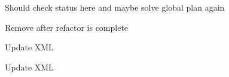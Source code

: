 
\begin{DoxyRefList}
\item[Member \mbox{\hyperlink{classtesseract__examples_1_1OnlinePlanningExample_a354985cdbaa511e24b5c010271477fad}{tesseract\+\_\+examples\+::Online\+Planning\+Example\+::online\+Plan}} ()]\label{todo__todo000004}%
%
Should check status here and maybe solve global plan again  
\item[Namespace \mbox{\hyperlink{namespacetesseract__planning}{tesseract\+\_\+planning}} ]\label{todo__todo000001}%
%
Remove after refactor is complete  
\item[Member \mbox{\hyperlink{classtesseract__planning_1_1DescartesDefaultPlanProfile_a8bbf9dd170dfc5da44f4117d74ca7a6a}{tesseract\+\_\+planning\+::Descartes\+Default\+Plan\+Profile\texorpdfstring{$<$}{<} Float\+Type \texorpdfstring{$>$}{>}\+::Descartes\+Default\+Plan\+Profile}} (const tinyxml2\+::\+XMLElement \&xml\+\_\+element)]\label{todo__todo000010}%
%
Update XML 

\label{todo__todo000011}%
%
Update XML 


\end{DoxyRefList}
